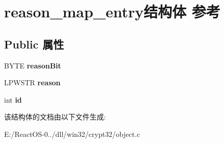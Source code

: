 \hypertarget{structreason__map__entry}{}\section{reason\+\_\+map\+\_\+entry结构体 参考}
\label{structreason__map__entry}
\subsection*{Public 属性}
\begin{DoxyCompactItemize}
\item 
\mbox{\label{structreason__map__entry_a9a1eb5216ad583b0ef5103d54c007450}} 
B\+Y\+TE {\bfseries reason\+Bit}
\item 
\mbox{\label{structreason__map__entry_ac069189112595fe840750fde339fd51b}} 
L\+P\+W\+S\+TR {\bfseries reason}
\item 
\mbox{\label{structreason__map__entry_abafa296cbdf543e0ab7574391bdff371}} 
int {\bfseries id}
\end{DoxyCompactItemize}


该结构体的文档由以下文件生成\+:\begin{DoxyCompactItemize}
\item 
E\+:/\+React\+O\+S-\/0../dll/win32/crypt32/object.\+c\end{DoxyCompactItemize}

